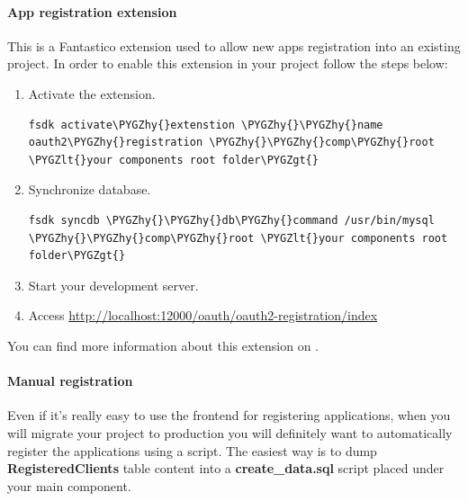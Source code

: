 \documentclass[letterpaper,10pt,english]{sphinxmanual}
\def\PYGZlt{\char`\<}
\def\PYGZgt{\char`\>}
\def\PYGZhy{\char`\-}
\begin{document}
\paragraph{App registration extension}
\label{features/oauth2/app_registration:app-registration-extension}
This is a Fantastico extension used to allow new apps registration into an existing project. In order to enable this extension
in your project follow the steps below:
\begin{enumerate}
\item {} 
Activate the extension.

\begin{Verbatim}[commandchars=\\\{\}]
fsdk activate\PYGZhy{}extenstion \PYGZhy{}\PYGZhy{}name oauth2\PYGZhy{}registration \PYGZhy{}\PYGZhy{}comp\PYGZhy{}root \PYGZlt{}your components root folder\PYGZgt{}
\end{Verbatim}

\item {} 
Synchronize database.

\begin{Verbatim}[commandchars=\\\{\}]
fsdk syncdb \PYGZhy{}\PYGZhy{}db\PYGZhy{}command /usr/bin/mysql \PYGZhy{}\PYGZhy{}comp\PYGZhy{}root \PYGZlt{}your components root folder\PYGZgt{}
\end{Verbatim}

\item {} 
Start your development server.

\item {} 
Access \href{http://localhost:12000/oauth/oauth2-registration/index}{http://localhost:12000/oauth/oauth2-registration/index}

\end{enumerate}

You can find more information about this extension on .


\paragraph{Manual registration}
\label{features/oauth2/app_registration:manual-registration}
Even if it's really easy to use the frontend for registering applications, when you will migrate your project to production
you will definitely want to automatically register the applications using a script. The easiest way is to dump \textbf{RegisteredClients}
table content into a \textbf{create\_data.sql} script placed under your main component.
\end{document}
